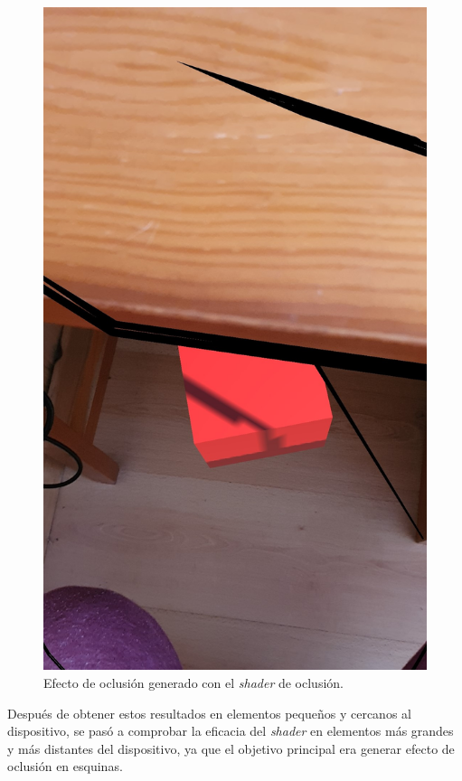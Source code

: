\begin{figure}[H]
    \centering
    \includegraphics[scale=0.18]{Images/Shaders/oclusionPrueba1.jpg}
    \caption{Efecto de oclusión generado con el \textit{shader} de oclusión.}
    \label{fig:oclusionp1}
\end{figure} 

Después de obtener estos resultados en elementos pequeños y cercanos al dispositivo, se pasó a comprobar la eficacia del \textit{shader} en elementos más grandes y más distantes del dispositivo, ya que el objetivo principal era generar efecto de oclusión en esquinas.\\

